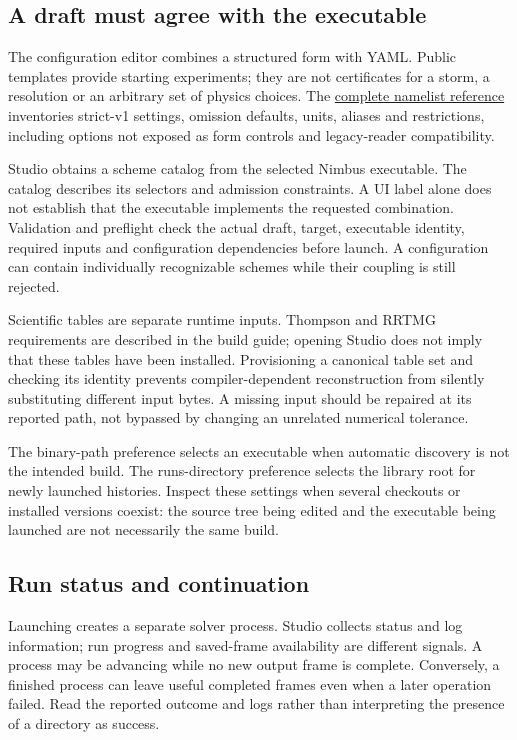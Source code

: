 \subsection{A draft must agree with the executable}
The configuration editor combines a structured form with YAML. Public templates
provide starting experiments; they are not certificates for a storm, a resolution
or an arbitrary set of physics choices. The
\href{NAMELIST.md}{complete namelist reference} inventories strict-v1 settings,
omission defaults, units, aliases and restrictions, including options not exposed
as form controls and legacy-reader compatibility.

Studio obtains a scheme catalog from the selected Nimbus executable. The catalog
describes its selectors and admission constraints. A UI label alone does not
establish that the executable implements the requested combination. Validation
and preflight check the actual draft, target, executable identity, required
inputs and configuration dependencies before launch. A configuration can contain
individually recognizable schemes while their coupling is still rejected.

Scientific tables are separate runtime inputs. Thompson and RRTMG requirements
are described in the build guide; opening Studio does not imply that these
tables have been installed. Provisioning a canonical table set and checking its
identity prevents compiler-dependent reconstruction from silently substituting
different input bytes. A missing input should be repaired at its reported path,
not bypassed by changing an unrelated numerical tolerance.

The binary-path preference selects an executable when automatic discovery is
not the intended build. The runs-directory preference selects the library root
for newly launched histories. Inspect these settings when several checkouts or
installed versions coexist: the source tree being edited and the executable
being launched are not necessarily the same build.

\subsection{Run status and continuation}
Launching creates a separate solver process. Studio collects status and log
information; run progress and saved-frame availability are different signals.
A process may be advancing while no new output frame is complete. Conversely,
a finished process can leave useful completed frames even when a later operation
failed. Read the reported outcome and logs rather than interpreting the presence
of a directory as success.

